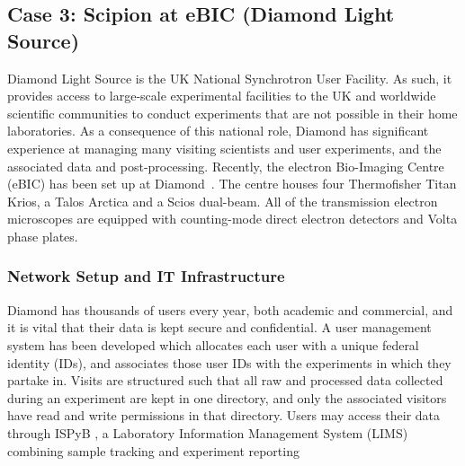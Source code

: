 
\subsection{Case 3: Scipion at eBIC (Diamond Light Source)}

Diamond Light Source is the UK National Synchrotron User Facility.  As such, it provides access to large-scale experimental facilities to the UK and worldwide scientific communities to conduct experiments that are not possible in their home laboratories.  As a consequence of this national role, Diamond has significant experience at managing many visiting scientists and user experiments, and the associated data and post-processing.  %
Recently, the electron Bio-Imaging Centre (eBIC) has been set up at Diamond~\citep{diamond2017}. The centre houses four Thermofisher Titan Krios, a Talos Arctica and a Scios dual-beam. All of the transmission electron microscopes are equipped with counting-mode direct electron detectors and Volta phase plates. 

\subsubsection{Network Setup and IT Infrastructure}

Diamond has thousands of users every year, both academic and commercial, and it is vital that their data is kept secure and confidential. A user management system has been developed which allocates each user with a unique federal identity (IDs), and associates those user IDs with the experiments in which they partake in. Visits are structured such that all raw and processed data collected during an experiment are kept in one directory, and only the associated visitors have read and write permissions in that directory. Users may access their data through ISPyB \citep{Delageniere2011:ispb},  a Laboratory Information Management System (LIMS) combining sample tracking and experiment reporting  %

